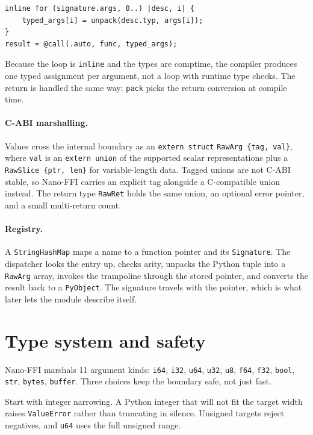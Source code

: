 \documentclass{jot}
\begin{document}
\begin{verbatim}
inline for (signature.args, 0..) |desc, i| {
    typed_args[i] = unpack(desc.typ, args[i]);
}
result = @call(.auto, func, typed_args);
\end{verbatim}

\noindent Because the loop is \texttt{inline} and the types are comptime, the compiler produces one typed assignment per argument, not a loop with runtime type checks. The return is handled the same way: \texttt{pack} picks the return conversion at compile time.

\paragraph{C-ABI marshalling.}
Values cross the internal boundary as an \texttt{extern struct} \texttt{RawArg \{tag, val\}}, where \texttt{val} is an \texttt{extern union} of the supported scalar representations plus a \texttt{RawSlice \{ptr, len\}} for variable-length data. Tagged unions are not C-ABI stable, so Nano-FFI carries an explicit tag alongside a C-compatible union instead. The return type \texttt{RawRet} holds the same union, an optional error pointer, and a small multi-return count.

\paragraph{Registry.}
A \texttt{StringHashMap} maps a name to a function pointer and its \texttt{Signature}. The dispatcher looks the entry up, checks arity, unpacks the Python tuple into a \texttt{RawArg} array, invokes the trampoline through the stored pointer, and converts the result back to a \texttt{PyObject}. The signature travels with the pointer, which is what later lets the module describe itself.

\section{Type system and safety}

Nano-FFI marshals 11 argument kinds: \texttt{i64}, \texttt{i32}, \texttt{u64}, \texttt{u32}, \texttt{u8}, \texttt{f64}, \texttt{f32}, \texttt{bool}, \texttt{str}, \texttt{bytes}, \texttt{buffer}. Three choices keep the boundary safe, not just fast.

Start with integer narrowing. A Python integer that will not fit the target width raises \texttt{ValueError} rather than truncating in silence. Unsigned targets reject negatives, and \texttt{u64} uses the full unsigned range.
\end{document}
